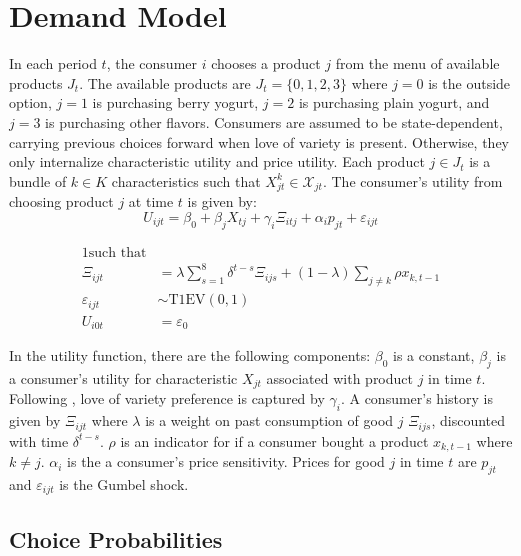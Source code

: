 \section{Demand Model}
\label{sec:demand-model}

  In each period $t$, the consumer $i$ chooses a product $j$ from the menu of available products $J_t$. The available products are $J_t = \{0,1,2,3\}$ where $j=0$ is the outside option, $j=1$ is purchasing berry yogurt, $j=2$ is purchasing plain yogurt, and $j=3$ is purchasing other flavors. Consumers are assumed to be state-dependent, carrying previous choices forward when love of variety is present. Otherwise, they only internalize characteristic utility and price utility. Each product $j\in J_t$ is a bundle of $k\in K$ characteristics such that $X_{jt}^k \in \mathcal{X}_{jt}$. The consumer's utility from choosing product $j$ at time $t$ is given by:
\begin{equation}
\label{eq:utility}
  U_{ijt} = \beta_0 + \beta_jX_{tj} + \gamma_i\Xi_{itj} + \alpha_ip_{jt} +
  \varepsilon_{ijt}
\end{equation}

\begin{alignat*}{1}
  \text{such that} \\
    \Xi_{ijt} &= \lambda\sum_{s=1}^{8}\delta^{t-s}\Xi_{ijs} + (1-\lambda)\sum_{j\ne k}\rho x_{k,t-1} \\
    \varepsilon_{ijt} &\sim \text{T1EV}(0,1) \\
    \text{$U_{i0t}$}&=\varepsilon_0 
\end{alignat*}

    In the utility function, there are the following components: $\beta_0$ is a constant, $\beta_j$ is a consumer's utility for characteristic $X_{jt}$ associated with product $j$ in time $t$. Following \citet{lattin_model_1987}, love of variety preference is captured by $\gamma_i$. A consumer's history is given by $\Xi_{ijt}$ where $\lambda$ is a weight on past consumption of good $j$ $\Xi_{ijs}$, discounted with time $\delta^{t-s}$. $\rho$ is an indicator for if a consumer bought a product $x_{k,t-1}$ where $k\ne j$. $\alpha_i$ is the a consumer's price sensitivity. Prices for good $j$ in time $t$ are $p_{jt}$ and $\varepsilon_{ijt}$ is the Gumbel shock.

\subsection{Choice Probabilities}

